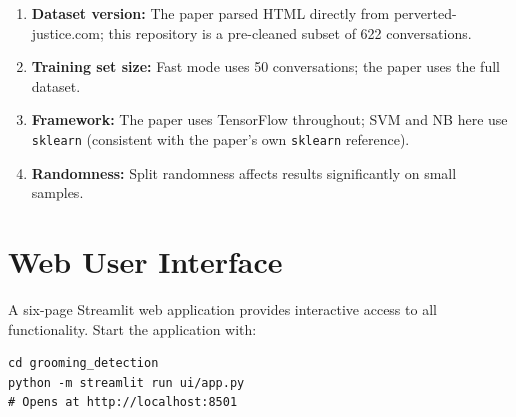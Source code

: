 \documentclass[12pt,a4paper]{article}
\begin{document}
\begin{enumerate}[leftmargin=*, label=\textbf{\arabic*.}]
  \item \textbf{Dataset version:} The paper parsed HTML directly from
        perverted-justice.com; this repository is a pre-cleaned subset
        of 622 conversations.
  \item \textbf{Training set size:} Fast mode uses 50 conversations;
        the paper uses the full dataset.
  \item \textbf{Framework:} The paper uses TensorFlow throughout; SVM
        and NB here use \texttt{sklearn} (consistent with the paper's
        own \texttt{sklearn} reference).
  \item \textbf{Randomness:} Split randomness affects results
        significantly on small samples.
\end{enumerate}

\section{Web User Interface}
\label{sec:ui}

A six-page Streamlit web application provides interactive access to all
functionality. Start the application with:

\begin{lstlisting}
cd grooming_detection
python -m streamlit run ui/app.py
# Opens at http://localhost:8501
\end{lstlisting}
\end{document}
